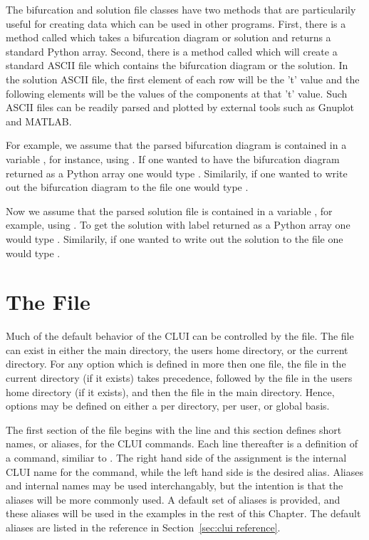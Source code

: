 \documentclass[12pt]{report}
\begin{document}
 The bifurcation and solution file classes have two methods that are 
 particularily useful for creating data which can be used in other
 programs.  First, there is a method called  which
 takes a bifurcation diagram or solution and
 returns a standard Python array.  Second, there is a method called
  which will create a standard ASCII file
 which contains the bifurcation diagram or the solution. 
 In the solution ASCII file, the first element of each row will be
 the 't' value and the following elements will be the
 values of the components at that 't' value. Such ASCII files
 can be readily parsed and plotted by external tools such as
 Gnuplot and MATLAB.

 For example, we assume
 that the parsed bifurcation diagram is contained in a variable
 , for instance, using .  If
 one wanted to have the bifurcation diagram returned as a Python array
 one would type .  Similarily, if one wanted
 to write out the bifurcation diagram to the file 
 one would type .

 Now we assume that the parsed solution file is contained
 in a variable , for example, using .
 To get the solution with label  returned as a Python
 array one would type .
 Similarily, if one wanted to write out the solution
 to the file  one would type
 .

 \section{ The  File }

 Much of the default behavior of the \AUTO CLUI
 can be controlled by the  file.
 The  file can exist in
 either the main \AUTO directory, the users
 home directory, or the current directory.  For any
 option which is defined in more then one file, 
 the  file
 in the current directory (if it exists) takes precedence, 
 followed by the  file
 in the users home directory (if it exists), and then the
  file in the main \AUTO directory.  Hence, 
 options may be defined on either a per directory, per
 user, or global basis.  

 The first section of the  file
 begins with the line 
 and this section defines short names, or aliases,
 for the \AUTO CLUI commands.  
 Each line thereafter is a definition of
 a command, similiar to 
 .
 The right hand side of the assignment
 is the internal \AUTO CLUI name for the command,
 while the left hand side is the desired alias.  
 Aliases and
 internal names may be used interchangably, but the
 intention is that the aliases will be more commonly
 used.  A default set of aliases is provided, and
 these aliases will be used in the examples in the
 rest of this Chapter.  The default aliases
 are listed in the reference in Section~\ref{sec:clui reference}.
\end{document}
